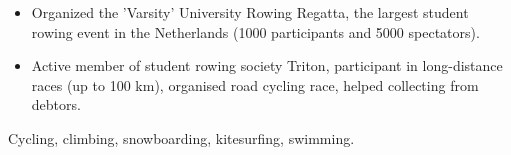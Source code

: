 \documentclass[10pt,a4paper,ragged2e]{altacv}
\begin{document}
\clearpage

\begin{itemize}
\item  Organized the 'Varsity' University Rowing Regatta, the largest student rowing event in the Netherlands (1000 participants and 5000 spectators).
\item Active member of student rowing society Triton, participant in long-distance races (up to 100 km), organised road cycling race, helped collecting from debtors.
\end{itemize}
Cycling, climbing, snowboarding, kitesurfing, swimming.

%
%
%
%
%
%

\end{document}
